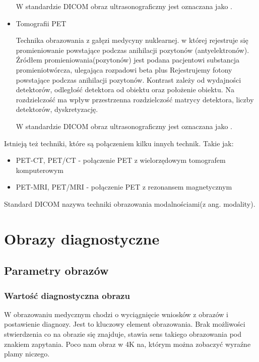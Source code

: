 \begin{itemize}
    W standardzie DICOM obraz ultrasonograficzny jest oznaczana jako .

    \item Tomografii PET
    
    Technika obrazowania  z gałęzi medycyny nuklearnej. w której rejestruje się promieniowanie powstające podczas anihilacji pozytonów (antyelektronów).
    Źródłem promieniowania(pozytonów) jest podana pacjentowi substancja promieniotwórcza, ulegająca rozpadowi beta plus
    Rejestrujemy fotony powstające podczas anihilacji pozytonów.
    Kontrast zależy od wydajności detektorów, odległość detektora od obiektu oraz położenie obiektu.
    Na rozdzielczość ma wpływ przestrzenna rozdzielczość matrycy detektora, liczby detektorów, dyskretyzację.

    W standardzie DICOM obraz ultrasonograficzny jest oznaczana jako .
    
\end{itemize}

Istnieją też techniki, które są połączeniem kilku innych technik.
Takie jak:
\begin{itemize}
    \item PET-CT, PET/CT - połączenie PET z wielorzędowym tomografem komputerowym
    \item PET-MRI, PET/MRI - połączenie PET z rezonansem magnetycznym
\end{itemize}

Standard DICOM nazywa techniki obrazowania modalnościami(z ang. modality).

\section{Obrazy diagnostyczne}

\subsection{Parametry obrazów}

\subsubsection{Wartość diagnostyczna obrazu}

W obrazowaniu medycznym chodzi o wyciągnięcie wniosków z obrazów i postawienie diagnozy.
Jest to kluczowy element obrazowania.
Brak możliwości stwierdzenia co na obrazie się znajduje, stawia sens takiego obrazowania pod znakiem zapytania.
Poco nam obraz w 4K na, którym można zobaczyć wyraźne plamy niczego.

